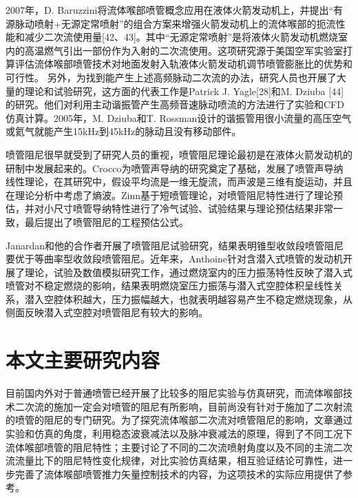 2007年，D. Baruzzini将流体喉部喷管概念应用在液体火箭发动机上，并提出“有源脉动喷射+无源定常喷射”的组合方案来增强火箭发动机上的流体喉部的扼流性能和减少二次流使用量[42、43]。其中“无源定常喷射”是将液体火箭发动机燃烧室内的高温燃气引出一部份作为入射的二次流使用。这项研究源于美国空军实验室打算评估流体喉部喷管技术对地面发射入轨液体火箭发动机调节喷管膨胀比的优势和可行性。
另外，为找到能产生上述高频脉动二次流的办法，研究人员也开展了大量的理论和试验研究，这方面的代表工作是Patrick J. Yagle[28]和M. Dziuba [44]的研究。他们对利用主动谐振管产生高频音速脉动喷流的方法进行了实验和CFD仿真计算。2005年，M. Dziuba和T. Rossman设计的谐振管用很小流量的高压空气或氦气就能产生15kHz到45kHz的脉动且没有移动部件。

喷管阻尼很早就受到了研究人员的重视，喷管阻尼理论最初是在液体火箭发动机的研制中发展起来的。Crocco为喷管声导纳的研究奠定了基础，发展了喷管声导纳线性理论，在其研究中，假设平均流是一维无旋流，而声波是三维有旋运动，并且在理论分析中考虑了熵波。Zinn基于短喷管理论，对喷管阻尼特性进行了理论预估，并对小尺寸喷管导纳特性进行了冷气试验、试验结果与理论预估结果非常一致，最后提出了喷管阻尼的工程预估公式。

Janardan和他的合作者开展了喷管阻尼试验研究，结果表明锥型收敛段喷管阻尼要优于等曲率型收敛段喷管阻尼。近年来，Anthoine针对含潜入式喷管的发动机开展了理论，试验及数值模拟研究工作，通过燃烧室内的压力振荡特性反映了潜入式喷管对不稳定燃烧的影响，结果表明燃烧室压力振荡与潜入式空腔体积呈线性关系，潜入空腔体积越大，压力振幅越大，也就表明越容易产生不稳定燃烧现象，从侧面反映潜入式空腔对喷管阻尼有较大的影响。

\section{本文主要研究内容}
目前国内外对于普通喷管已经开展了比较多的阻尼实验与仿真研究，而流体喉部技术二次流的施加一定会对喷管的阻尼有所影响，目前尚没有针对于施加了二次射流的喷管的阻尼的专门研究。为了探究流体喉部二次流对喷管阻尼的影响，文章通过实验和仿真的角度，利用稳态波衰减法以及脉冲衰减法的原理，得到了不同工况下流体喉部喷管的阻尼特性；主要讨论了不同的二次流喷射角度以及不同的主流二次流流量比下的阻尼特性变化规律，对比实验仿真结果，相互验证结论可靠性，进一步完善了流体喉部喷管推力矢量控制技术的内容，为这项技术的实际应用提供了参考。


